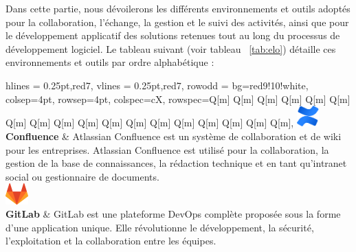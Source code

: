 Dans cette partie, nous dévoilerons les différents environnements et outils adoptés pour la collaboration, l'échange, la gestion et le suivi des activités, ainsi que pour le développement applicatif des solutions retenues tout au long du processus de développement logiciel. Le tableau suivant (voir tableau ~\ref{tab:elo}) détaille ces environnements et outils par ordre alphabétique :
\begin{longtblr}[caption={Environnements et outils de développement et de collaboration},label={tab:elo}]{
    hlines = {0.25pt,red7},
    vlines = {0.25pt,red7},
    row{odd} = {bg=red9!10!white},
    colsep=4pt,
    rowsep=4pt,
	colspec={cX},
    rowspec={Q[m] Q[m] Q[m] Q[m] Q[m] Q[m] Q[m] Q[m] Q[m] Q[m] Q[m] Q[m] Q[m] Q[m] Q[m] Q[m] Q[m] Q[m]},
}
{
\includegraphics[height=8mm]{images/sec5/confluence.pdf}
\\\textbf{Confluence}
}
& 
Atlassian Confluence est un système de collaboration et de wiki pour les entreprises.
Atlassian Confluence est utilisé pour la collaboration, la gestion de la base de connaissances, la rédaction technique et en tant qu'intranet social ou gestionnaire de documents.\\

{
\includegraphics[height=8mm]{images/sec5/gitlab.pdf}\\\textbf{GitLab}
}
& 
GitLab est une plateforme DevOps complète proposée sous la forme d'une application unique. Elle révolutionne le développement, la sécurité, l'exploitation et la collaboration entre les équipes. 
\\


\end{longtblr}
